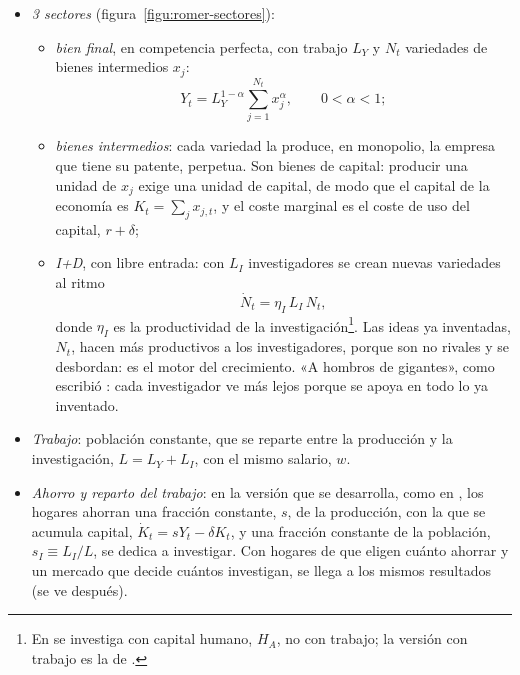 \documentclass[11pt]{article}
\begin{document}
\begin{itemize}
\item \emph{3 sectores} (figura~\ref{figu:romer-sectores}):
  \begin{itemize}
  \item \emph{bien final}, en competencia perfecta, con trabajo $L_Y$ y $N_t$ variedades de bienes intermedios $x_j$:
    \begin{equation}
    Y_t=L_Y^{1-\alpha}\sum_{j=1}^{N_t}x_{j}^{\alpha},\qquad 0<\alpha<1;\label{eq:romer-y}
    \end{equation}
  \item \emph{bienes intermedios}: cada variedad la produce, en monopolio, la empresa que tiene su patente, perpetua. Son bienes de capital: producir una unidad de $x_j$ exige una unidad de capital, de modo que el capital de la economía es $K_t=\sum_jx_{j,t}$, y el coste marginal es el coste de uso del capital, $r+\delta$;
  \item \emph{I+D}, con libre entrada: con $L_I$ investigadores se crean nuevas variedades al ritmo
    \begin{equation}
    \dot N_t=\eta_I\,L_I\,N_t,\label{eq:romer-ideas}
    \end{equation}
    donde $\eta_I$ es la productividad de la investigación\footnote{En \textcite{Romer1990} se investiga con capital humano, $H_A$, no con trabajo; la versión con trabajo es la de \textcite[sec.~13.2]{Acemoglu2009}.}. Las ideas ya inventadas, $N_t$, hacen más productivos a los investigadores, porque son no rivales y se desbordan: es el motor del crecimiento. «A hombros de gigantes», como escribió : cada investigador ve más lejos porque se apoya en todo lo ya inventado.
  \end{itemize}
\item \emph{Trabajo}: población constante, que se reparte entre la producción y la investigación, $L=L_Y+L_I$, con el mismo salario, $w$.
\item \emph{Ahorro y reparto del trabajo}: en la versión que se desarrolla, como en , los hogares ahorran una fracción constante, $s$, de la producción, con la que se acumula capital, $\dot K_t=sY_t-\delta K_t$, y una fracción constante de la población, $s_I\equiv L_I/L$, se dedica a investigar\nocite{Jones2002Introduction}. Con hogares de  que eligen cuánto ahorrar y un mercado que decide cuántos investigan, se llega a los mismos resultados (se ve después).
\end{itemize}
\end{document}
